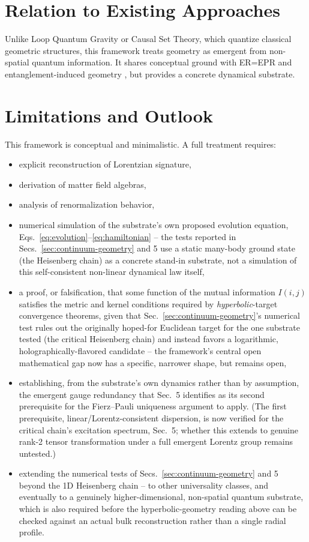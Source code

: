 \documentclass[11pt]{article}
\begin{document}
\section{Relation to Existing Approaches}

Unlike Loop Quantum Gravity or Causal Set Theory, which quantize classical geometric structures, this framework treats geometry as emergent from non-spatial quantum information. It shares conceptual ground with ER=EPR \cite{ERPR} and entanglement-induced geometry \cite{VanRaamsdonk}, but provides a concrete dynamical substrate.

\section{Limitations and Outlook}
\label{sec:limitations}

This framework is conceptual and minimalistic. A full treatment requires:
\begin{itemize}
\item explicit reconstruction of Lorentzian signature,
\item derivation of matter field algebras,
\item analysis of renormalization behavior,
\item numerical simulation of the substrate's own proposed evolution equation, Eqs.~\eqref{eq:evolution}--\eqref{eq:hamiltonian} -- the tests reported in Secs.~\ref{sec:continuum-geometry} and 5 use a static many-body ground state (the Heisenberg chain) as a concrete stand-in substrate, not a simulation of this self-consistent non-linear dynamical law itself,
\item a proof, or falsification, that some function of the mutual information $I(i,j)$ satisfies the metric and kernel conditions required by \emph{hyperbolic}-target convergence theorems, given that Sec.~\ref{sec:continuum-geometry}'s numerical test rules out the originally hoped-for Euclidean target for the one substrate tested (the critical Heisenberg chain) and instead favors a logarithmic, holographically-flavored candidate -- the framework's central open mathematical gap now has a specific, narrower shape, but remains open,
\item establishing, from the substrate's own dynamics rather than by assumption, the emergent gauge redundancy that Sec.~5 identifies as its second prerequisite for the Fierz--Pauli uniqueness argument to apply. (The first prerequisite, linear/Lorentz-consistent dispersion, is now verified for the critical chain's excitation spectrum, Sec.~5; whether this extends to genuine rank-2 tensor transformation under a full emergent Lorentz group remains untested.)
\item extending the numerical tests of Secs.~\ref{sec:continuum-geometry} and 5 beyond the 1D Heisenberg chain -- to other universality classes, and eventually to a genuinely higher-dimensional, non-spatial quantum substrate, which is also required before the hyperbolic-geometry reading above can be checked against an actual bulk reconstruction rather than a single radial profile.
\end{itemize}
\end{document}
